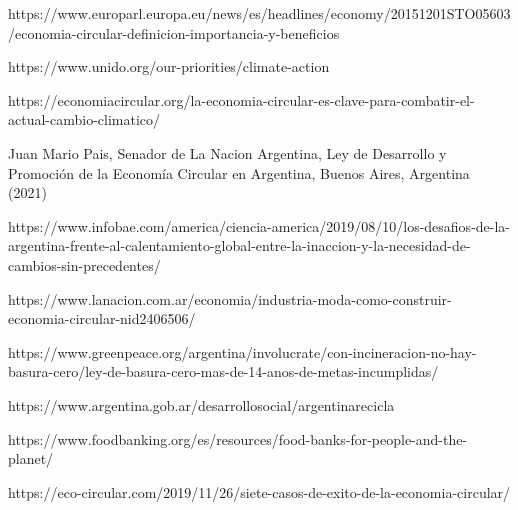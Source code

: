 \documentclass[runningheads]{llncs}
\begin{document}
\begin{thebibliography}{8}
https://www.europarl.europa.eu/news/es/headlines/economy/20151201STO05603/economia-circular-definicion-importancia-y-beneficios

https://www.unido.org/our-priorities/climate-action

https://economiacircular.org/la-economia-circular-es-clave-para-combatir-el-actual-cambio-climatico/

Juan Mario Pais, Senador de La Nacion Argentina, Ley de Desarrollo y Promoción de la Economía Circular en Argentina, Buenos Aires, Argentina (2021)

https://www.infobae.com/america/ciencia-america/2019/08/10/los-desafios-de-la-argentina-frente-al-calentamiento-global-entre-la-inaccion-y-la-necesidad-de-cambios-sin-precedentes/

https://www.lanacion.com.ar/economia/industria-moda-como-construir-economia-circular-nid2406506/

https://www.greenpeace.org/argentina/involucrate/con-incineracion-no-hay-basura-cero/ley-de-basura-cero-mas-de-14-anos-de-metas-incumplidas/

https://www.argentina.gob.ar/desarrollosocial/argentinarecicla

https://www.foodbanking.org/es/resources/food-banks-for-people-and-the-planet/

https://eco-circular.com/2019/11/26/siete-casos-de-exito-de-la-economia-circular/

\end{thebibliography}
\end{document}
